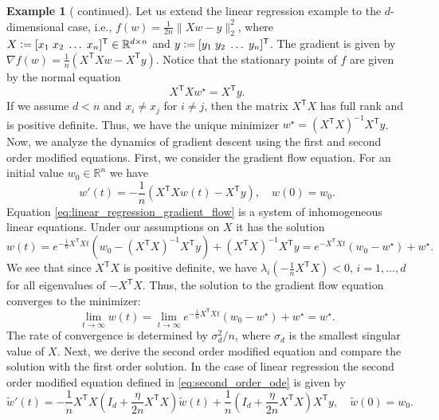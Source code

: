 \documentclass[12pt]{article}
\theoremstyle{definition}
\newtheorem{example}[example]{Example}
\numberwithin{equation}{section}
\newcommand{\R}{\mathbb{R}}
\newcommand{\T}{\mathsf{T}}
\newcommand{\norm}[1]{\lVert{#1}\rVert_2}
\newcommand{\defeq}{\vcentcolon=}
\begin{document}
\begin{example}[ continued]
  Let us extend the linear regression example to the $d$-dimensional case, i.e., $f(w)=\frac{1}{2n} \norm{Xw - y}^2$, where $X \defeq [x_1\;x_2\;\dots\;x_n]^\T \in \R^{d \times n}$ and $y \defeq [y_1\;y_2\;\dots\;y_n]^\T$. 
  The gradient is given by $\nabla f(w) = \frac{1}{n}\left(X^\T Xw - X^\T y\right)$. 
  Notice that the stationary points of $f$ are given by the normal equation
  \begin{equation*}
    X^\T Xw^\star = X^\T y.
  \end{equation*}
  If we assume $d < n$ and $x_i \neq x_j$ for $i \neq j$, then the matrix $X^\T X$ has full rank and is positive definite. Thus, we have the unique minimizer $w^\star = (X^\T X)^{-1}X^\T y$.
  Now, we analyze the dynamics of gradient descent using the first and second order modified equations. First, we consider the gradient flow equation.
  For an initial value $w_0 \in \R^n$ we have 
  \begin{equation}
    \label{eq:linear_regression_gradient_flow}
    w'(t) = -\frac{1}{n}\left(X^\T Xw(t) - X^\T y\right), \quad w(0) = w_0.
  \end{equation}
  Equation \eqref{eq:linear_regression_gradient_flow} is a system of inhomogeneous linear equations. Under our assumptions on $X$ it has the solution
  \begin{equation*}
    w(t) = e^{-\frac{1}{n}X^\T Xt}(w_0 - (X^\T X)^{-1}X^\T y) + (X^\T X)^{-1}X^\T y = e^{-X^\T Xt}(w_0 - w^\star) + w^\star.
  \end{equation*}
  We see that since $X^\T X$ is positive definite, we have $\lambda_i(-\frac{1}{n}X^\T X) < 0$, $i = 1, \dots, d$ for all eigenvalues of $-X^\T X$. Thus, the solution to the gradient flow equation converges to the minimizer:
  \begin{equation*}
    \lim_{t \rightarrow \infty} w(t) = \lim_{t \rightarrow \infty} e^{-\frac{1}{n}X^\T Xt}(w_0 - w^\star) + w^\star = w^\star.
  \end{equation*}
  The rate of convergence is determined by $\sigma_d^2/n$, where $\sigma_d$ is the smallest singular value of $X$. Next, we derive the second order modified equation and compare the solution with the first order solution. In the case of linear regression the second order modified equation defined in \eqref{eq:second_order_ode} is given by
  \begin{equation*}
    \widetilde{w}'(t) = -\frac{1}{n}X^\T X \left(I_d + \frac{\eta}{2n}X^\T X\right)\widetilde{w}(t) + \frac{1}{n}\left(I_d + \frac{\eta}{2n} X^\T X\right)X^\T y, \quad \widetilde{w}(0) = w_0.

\end{equation*}
\end{example}
\end{document}

